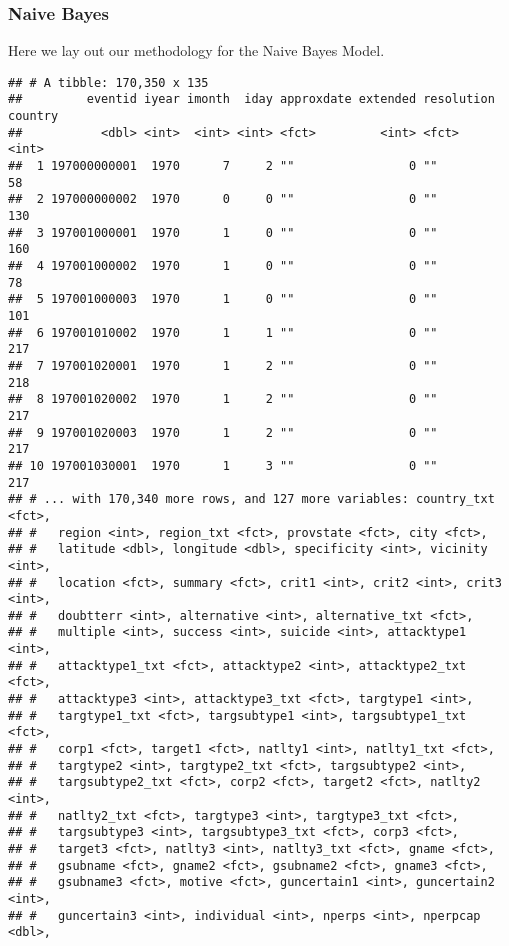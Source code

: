 \documentclass[11pt,letterpaper,]{article}
\theoremstyle{definition}
\theoremstyle{definition}
\theoremstyle{definition}
\theoremstyle{remark}
\begin{document}
\subsubsection{Naive Bayes}\label{naive-bayes}

Here we lay out our methodology for the Naive Bayes Model.

\begin{verbatim}
## # A tibble: 170,350 x 135
##         eventid iyear imonth  iday approxdate extended resolution country
##           <dbl> <int>  <int> <int> <fct>         <int> <fct>        <int>
##  1 197000000001  1970      7     2 ""                0 ""              58
##  2 197000000002  1970      0     0 ""                0 ""             130
##  3 197001000001  1970      1     0 ""                0 ""             160
##  4 197001000002  1970      1     0 ""                0 ""              78
##  5 197001000003  1970      1     0 ""                0 ""             101
##  6 197001010002  1970      1     1 ""                0 ""             217
##  7 197001020001  1970      1     2 ""                0 ""             218
##  8 197001020002  1970      1     2 ""                0 ""             217
##  9 197001020003  1970      1     2 ""                0 ""             217
## 10 197001030001  1970      1     3 ""                0 ""             217
## # ... with 170,340 more rows, and 127 more variables: country_txt <fct>,
## #   region <int>, region_txt <fct>, provstate <fct>, city <fct>,
## #   latitude <dbl>, longitude <dbl>, specificity <int>, vicinity <int>,
## #   location <fct>, summary <fct>, crit1 <int>, crit2 <int>, crit3 <int>,
## #   doubtterr <int>, alternative <int>, alternative_txt <fct>,
## #   multiple <int>, success <int>, suicide <int>, attacktype1 <int>,
## #   attacktype1_txt <fct>, attacktype2 <int>, attacktype2_txt <fct>,
## #   attacktype3 <int>, attacktype3_txt <fct>, targtype1 <int>,
## #   targtype1_txt <fct>, targsubtype1 <int>, targsubtype1_txt <fct>,
## #   corp1 <fct>, target1 <fct>, natlty1 <int>, natlty1_txt <fct>,
## #   targtype2 <int>, targtype2_txt <fct>, targsubtype2 <int>,
## #   targsubtype2_txt <fct>, corp2 <fct>, target2 <fct>, natlty2 <int>,
## #   natlty2_txt <fct>, targtype3 <int>, targtype3_txt <fct>,
## #   targsubtype3 <int>, targsubtype3_txt <fct>, corp3 <fct>,
## #   target3 <fct>, natlty3 <int>, natlty3_txt <fct>, gname <fct>,
## #   gsubname <fct>, gname2 <fct>, gsubname2 <fct>, gname3 <fct>,
## #   gsubname3 <fct>, motive <fct>, guncertain1 <int>, guncertain2 <int>,
## #   guncertain3 <int>, individual <int>, nperps <int>, nperpcap <dbl>,

\end{verbatim}
\end{document}
